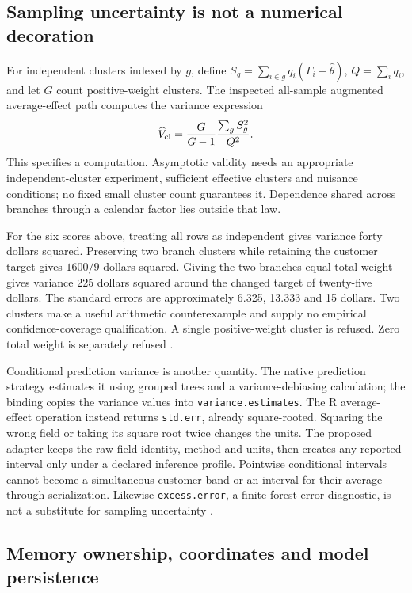 \subsection{Sampling uncertainty is not a numerical decoration}

For independent clusters indexed by \(g\), define
\(S_g=\sum_{i\in g}q_i(\Gamma_i-\widehat\theta)\), \(Q=\sum_iq_i\), and
let \(G\) count positive-weight clusters. The inspected all-sample
augmented average-effect path computes the variance expression \[
 \widehat V_{\rm cl}=\frac{G}{G-1}\frac{\sum_g S_g^2}{Q^2}.
\] This specifies a computation. Asymptotic validity needs an
appropriate independent-cluster experiment, sufficient effective
clusters and nuisance conditions; no fixed small cluster count
guarantees it. Dependence shared across branches through a calendar
factor lies outside that law.

For the six scores above, treating all rows as independent gives
variance forty dollars squared. Preserving two branch clusters while
retaining the customer target gives \(1600/9\) dollars squared. Giving
the two branches equal total weight gives variance 225 dollars squared
around the changed target of twenty-five dollars. The standard errors
are approximately 6.325, 13.333 and 15 dollars. Two clusters make a
useful arithmetic counterexample and supply no empirical
confidence-coverage qualification. A single positive-weight cluster is
refused. Zero total weight is separately refused
\cite{exec13_grf_oracle,exec13_grf_rpath}.

Conditional prediction variance is another quantity. The native
prediction strategy estimates it using grouped trees and a
variance-debiasing calculation; the binding copies the variance values
into \texttt{variance.estimates}. The R average-effect operation instead
returns \texttt{std.err}, already square-rooted. Squaring the wrong
field or taking its square root twice changes the units. The proposed
adapter keeps the raw field identity, method and units, then creates any
reported interval only under a declared inference profile. Pointwise
conditional intervals cannot become a simultaneous customer band or an
interval for their average through serialization. Likewise
\texttt{excess.error}, a finite-forest error diagnostic, is not a
substitute for sampling uncertainty
\cite{exec13_grf_native,exec13_grf_rpath}.

\subsection{Memory ownership, coordinates and model persistence}

